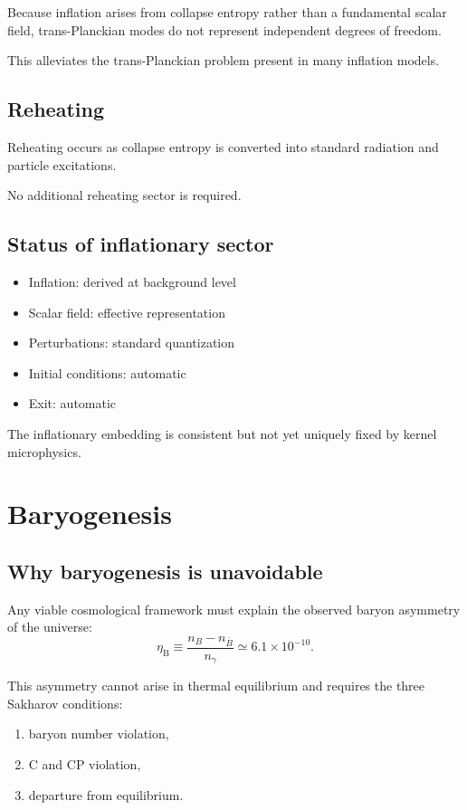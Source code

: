 \documentclass[11pt]{book}
\newcommand{\etaB}{\eta_{\mathrm{B}}}
\begin{document}
Because inflation arises from collapse entropy rather than a fundamental
scalar field, trans-Planckian modes do not represent independent degrees
of freedom.

This alleviates the trans-Planckian problem present in many inflation
models.

\section{Reheating}

Reheating occurs as collapse entropy is converted into standard
radiation and particle excitations.

No additional reheating sector is required.

\section{Status of inflationary sector}

\begin{itemize}
\item Inflation: derived at background level
\item Scalar field: effective representation
\item Perturbations: standard quantization
\item Initial conditions: automatic
\item Exit: automatic
\end{itemize}

The inflationary embedding is consistent but not yet uniquely fixed
by kernel microphysics.

\chapter{Baryogenesis}

\section{Why baryogenesis is unavoidable}

Any viable cosmological framework must explain the observed baryon
asymmetry of the universe:
\begin{equation}
\etaB \equiv \frac{n_B - n_{\bar B}}{n_\gamma}
\simeq 6.1\times10^{-10}.
\end{equation}

This asymmetry cannot arise in thermal equilibrium and requires the
three Sakharov conditions:
\begin{enumerate}[label=(S\arabic*)]
\item baryon number violation,
\item C and CP violation,
\item departure from equilibrium.
\end{enumerate}
\end{document}
